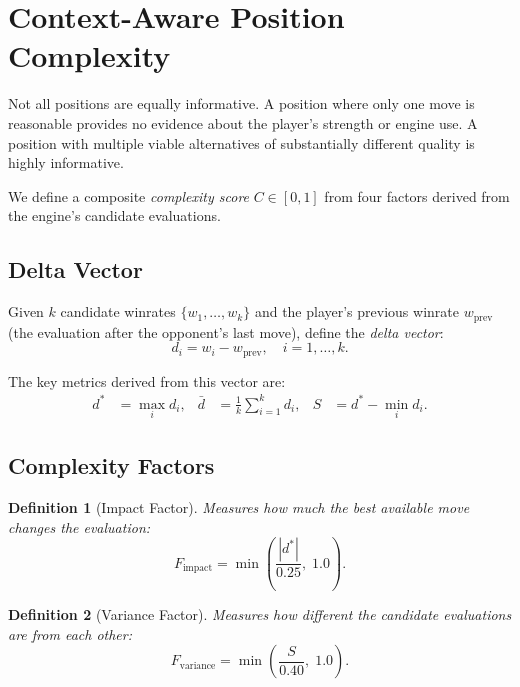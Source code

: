 \documentclass[11pt,a4paper]{article}
\newtheorem{definition}{Definition}
\begin{document}
\section{Context-Aware Position Complexity}
\label{sec:complexity}

Not all positions are equally informative. A position where only one move
is reasonable provides no evidence about the player's strength or engine use.
A position with multiple viable alternatives of substantially different quality
is highly informative.

We define a composite \emph{complexity score} $C \in [0, 1]$ from four
factors derived from the engine's candidate evaluations.

\subsection{Delta Vector}

Given $k$ candidate winrates $\{w_1, \ldots, w_k\}$ and the player's previous
winrate $w_{\text{prev}}$ (the evaluation after the opponent's last move),
define the \emph{delta vector}:
\begin{equation}
    d_i = w_i - w_{\text{prev}}, \quad i = 1, \ldots, k.
    \label{eq:delta_vector}
\end{equation}

The key metrics derived from this vector are:
\begin{align}
    d^* &= \max_i d_i, &  \bar{d} &= \frac{1}{k}\sum_{i=1}^{k} d_i,  &
    S &= d^* - \min_i d_i.
    \label{eq:delta_metrics}
\end{align}

\subsection{Complexity Factors}

\begin{definition}[Impact Factor]
\label{def:impact}
Measures how much the best available move changes the evaluation:
\begin{equation}
    F_{\text{impact}} = \min\!\left(\frac{|d^*|}{0.25},\; 1.0\right).
    \label{eq:impact}
\end{equation}
\end{definition}

\begin{definition}[Variance Factor]
\label{def:variance}
Measures how different the candidate evaluations are from each other:
\begin{equation}
    F_{\text{variance}} = \min\!\left(\frac{S}{0.40},\; 1.0\right).
    \label{eq:variance}
\end{equation}
\end{definition}
\end{document}
